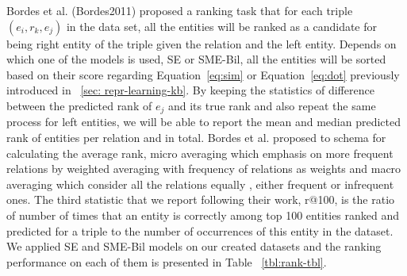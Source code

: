 Bordes et al. (Bordes2011) proposed a ranking task that for each triple $(e_{i} , r_{k}, e_{j} )$ in the data set,
 all the entities will be ranked as a candidate for being right entity of the triple 
 given the relation and the left entity. Depends on which one of the models is used, SE or SME-Bil, all the entities will be sorted
  based on their score regarding Equation~\eqref{eq:sim} or
  Equation~\ref{eq:dot} previously introduced in ~\autoref{sec:
  repr-learning-kb}.
  By keeping the statistics of difference between the predicted rank of $e_{j}$ and its true rank and also repeat the same process
  for left entities, we will be able to report the mean and median predicted rank of entities per relation and in total. Bordes et al.
   proposed to schema for calculating the average rank, micro averaging which emphasis on more frequent relations by
    weighted averaging with frequency of relations as weights and macro averaging which consider all the relations equally
    , either frequent or infrequent ones. The third statistic that we report following their work, r@100, is the ratio of number of times that 
    an entity is correctly among top 100 entities ranked and predicted for a triple to the number of occurrences of this entity in the dataset.
    We applied SE and SME-Bil models on our created datasets and the ranking performance on each of them is presented in Table ~\ref{tbl:rank-tbl}.
	
